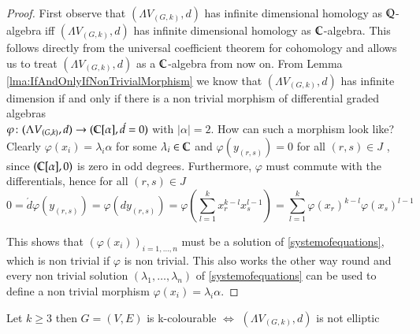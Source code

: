 \begin{proof}
 First observe that $(\Lambda V_{(G,k)}, d)$ has infinite dimensional homology as $\mathbb{Q}$-algebra iff 
 $(\Lambda V_{(G,k)}, d) $ has infinite dimensional homology as $\mathbb{C}$-algebra. This follows directly from 
 the universal coefficient theorem for cohomology and allows us to treat $(\Lambda V_{(G,k)}, d)$ as a $\mathbb{C}$-algebra
 from now on.
 From Lemma \ref{lma:IfAndOnlyIfNonTrivialMorphism} we know that $(\Lambda V_{(G,k)},d)$  has infinite dimension if and only if 
 there is a non trivial morphism of differential graded algebras \\
 ${\varphi \colon (\Lambda V_{(G,k)},d) \to ( \mathbb{C} [\alpha] ,\acute{d} = 0)}$ with $|\alpha| = 2$. How can such a morphism look like?
 Clearly $\varphi(x_i) = \lambda_i \alpha$ for some $\lambda_i \in \mathbb{C}$ and $\varphi(y_{(r,s)}) = 0$ for all $(r,s) \in J$ , since 
 $(\mathbb{C} [\alpha] , 0)$ is zero in odd degrees. Furthermore, $\varphi$ must commute with the differentials, hence 
 for all $(r,s) \in J$
 $$ 0 = \acute{d} \varphi(y_{(r,s)}) = \varphi(dy_{(r,s)}) = \varphi(\sum_{l = 1}^k x_r^{k -l} x_s^{l - 1})
 = \sum_{l = 1}^k \varphi(x_r)^{k -l} \varphi(x_s)^{l - 1}$$
 
 This shows that $(\varphi(x_i))_{i = 1, \dotsc , n}$ must be a solution of \ref{systemofequations}, which is non trivial
 if $\varphi$ is non trivial.
 This also works the other way round and every non trivial solution  $(\lambda_1 , \dotsc, \lambda_n)$ of \ref{systemofequations}
 can be used to define a non trivial morphism $\varphi(x_i) = \lambda_i \alpha$.
 \end{proof}

 \begin{Theorem}
 \label{thm:KColourEquivalentToNonEllipticity}
  Let $k \geq 3$ then 
   $G = (V,E)$ is k-colourable $\iff$ $(\Lambda V_{(G,k)},d)$ is not elliptic
 \end{Theorem}

